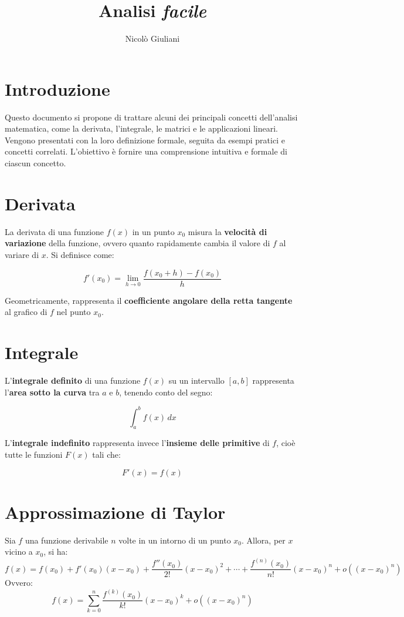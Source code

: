 \documentclass{article}
\title{Analisi \textit{facile}}
\author{Nicolò Giuliani}
\date{}
\begin{document}
\maketitle

\section*{Introduzione}
Questo documento si propone di trattare alcuni dei principali concetti dell'analisi matematica, come la derivata, l'integrale, le matrici e le applicazioni lineari. Vengono presentati con la loro definizione formale, seguita da esempi pratici e concetti correlati. L'obiettivo è fornire una comprensione intuitiva e formale di ciascun concetto.

\section{Derivata}
La derivata di una funzione \( f(x) \) in un punto \( x_0 \) misura la \textbf{velocità di variazione} della funzione, ovvero quanto rapidamente cambia il valore di \( f \) al variare di \( x \). Si definisce come:

\[
f'(x_0) = \lim_{h \to 0} \frac{f(x_0 + h) - f(x_0)}{h}
\]

Geometricamente, rappresenta il \textbf{coefficiente angolare della retta tangente} al grafico di \( f \) nel punto \( x_0 \).

\section{Integrale}
L'\textbf{integrale definito} di una funzione \( f(x) \) su un intervallo \([a, b]\) rappresenta l'\textbf{area sotto la curva} tra \( a \) e \( b \), tenendo conto del segno:

\[
\int_a^b f(x) \, dx
\]

L'\textbf{integrale indefinito} rappresenta invece l'\textbf{insieme delle primitive} di \( f \), cioè tutte le funzioni \( F(x) \) tali che:

\[
F'(x) = f(x)
\]

\section{Approssimazione di Taylor}
Sia \( f \) una funzione derivabile \( n \) volte in un intorno di un punto \( x_0 \). Allora, per \( x \) vicino a \( x_0 \), si ha:
\[
f(x) = f(x_0) + f'(x_0)(x - x_0) + \frac{f''(x_0)}{2!}(x - x_0)^2 + \cdots + \frac{f^{(n)}(x_0)}{n!}(x - x_0)^n + o((x - x_0)^n)
\]
Ovvero:
\[
f(x) = \sum_{k=0}^{n} \frac{f^{(k)}(x_0)}{k!}(x - x_0)^k + o((x - x_0)^n)
\]
\end{document}
